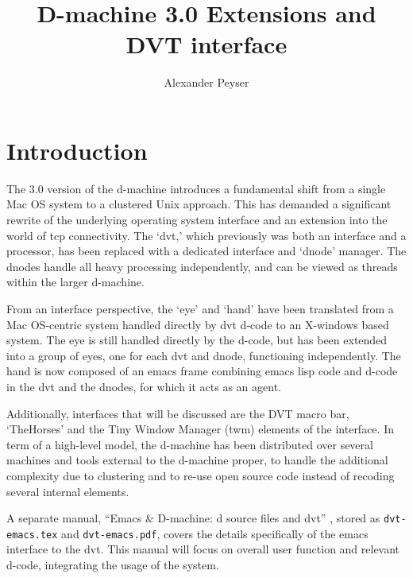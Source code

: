 \documentclass[12pt]{article}
\title{
  \vspace*{-2\baselineskip}
  D-machine 3.0 Extensions and DVT interface\\
  \titleversion
}
\author{Alexander Peyser}
\begin{document}
\maketitle\vspace{-4\baselineskip}
\tableofcontents{}
\newpage

\setlength{\parindent}{0pt}
\setlength{\parskip}{6pt}

\section{Introduction}
\label{sec:intro}

The 3.0 version of the d-machine introduces a fundamental shift from a
single Mac OS system to a clustered Unix approach.  This has demanded
a significant rewrite of the underlying operating system interface and
an extension into the world of tcp connectivity. The `dvt,' which
previously was both an interface and a processor, has been replaced
with a dedicated interface and `dnode' manager.  The dnodes handle all
heavy processing independently, and can be viewed as threads within
the larger d-machine.

From an interface perspective, the `eye' and `hand' have been
translated from a Mac OS-centric system handled directly by dvt d-code
to an X-windows based system.  The eye is still handled directly by
the d-code, but has been extended into a group of eyes, one for each
dvt and dnode, functioning independently.  The hand is now composed of
an emacs frame combining emacs lisp code and d-code in the dvt and the
dnodes, for which it acts as an agent.

Additionally, interfaces that will be discussed are the DVT macro bar,
`TheHorses' and the Tiny Window Manager (twm) elements of the
interface. In term of a high-level model, the d-machine has been
distributed over several machines and tools external to the d-machine
proper, to handle the additional complexity due to clustering and to
re-use open source code instead of recoding several internal elements.

A separate manual, ``Emacs \& D-machine: d source files and dvt''
\citep{dvt-emacs}, stored as \verb$dvt-emacs.tex$ and
\verb$dvt-emacs.pdf$, covers the details specifically of the emacs
interface to the dvt.  This manual will focus on overall user function
and relevant d-code, integrating the usage of the system.
\end{document}
